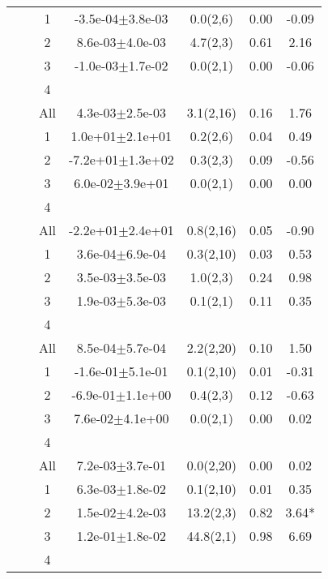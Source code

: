 \begin{longtable}{llccccS[table-format=-2.2, table-space-text-post = {***}]}
{} & {} & 1 & -3.5e-04$\pm$3.8e-03 & 0.0(2,6) & 0.00 & -0.09 \\ 
   &  & 2 &  8.6e-03$\pm$4.0e-03 & 4.7(2,3) & 0.61 & 2.16 \\ 
   &  & 3 & -1.0e-03$\pm$1.7e-02 & 0.0(2,1) & 0.00 & -0.06 \\ 
   &  & 4 &  &  &  &  \\ 
   &  & All &  4.3e-03$\pm$2.5e-03 & 3.1(2,16) & 0.16 & 1.76 \\ 
   \midrule
{} & {} & 1 &  1.0e+01$\pm$2.1e+01 & 0.2(2,6) & 0.04 & 0.49 \\ 
   &  & 2 & -7.2e+01$\pm$1.3e+02 & 0.3(2,3) & 0.09 & -0.56 \\ 
   &  & 3 &  6.0e-02$\pm$3.9e+01 & 0.0(2,1) & 0.00 & 0.00 \\ 
   &  & 4 &  &  &  &  \\ 
   &  & All & -2.2e+01$\pm$2.4e+01 & 0.8(2,16) & 0.05 & -0.90 \\ 
   \midrule
{} & {} & 1 &  3.6e-04$\pm$6.9e-04 & 0.3(2,10) & 0.03 & 0.53 \\ 
   &  & 2 &  3.5e-03$\pm$3.5e-03 & 1.0(2,3) & 0.24 & 0.98 \\ 
   &  & 3 &  1.9e-03$\pm$5.3e-03 & 0.1(2,1) & 0.11 & 0.35 \\ 
   &  & 4 &  &  &  &  \\ 
   &  & All &  8.5e-04$\pm$5.7e-04 & 2.2(2,20) & 0.10 & 1.50 \\ 
   \midrule
{} & {} & 1 & -1.6e-01$\pm$5.1e-01 & 0.1(2,10) & 0.01 & -0.31 \\ 
   &  & 2 & -6.9e-01$\pm$1.1e+00 & 0.4(2,3) & 0.12 & -0.63 \\ 
   &  & 3 &  7.6e-02$\pm$4.1e+00 & 0.0(2,1) & 0.00 & 0.02 \\ 
   &  & 4 &  &  &  &  \\ 
   &  & All &  7.2e-03$\pm$3.7e-01 & 0.0(2,20) & 0.00 & 0.02 \\ 
   \midrule
{} & {} & 1 &  6.3e-03$\pm$1.8e-02 & 0.1(2,10) & 0.01 & 0.35 \\ 
   &  & 2 &  1.5e-02$\pm$4.2e-03 & 13.2(2,3) & 0.82 & 3.64* \\ 
   &  & 3 &  1.2e-01$\pm$1.8e-02 & 44.8(2,1) & 0.98 & 6.69 \\ 
   &  & 4 &  &  &  &  \\ 

\end{longtable}
